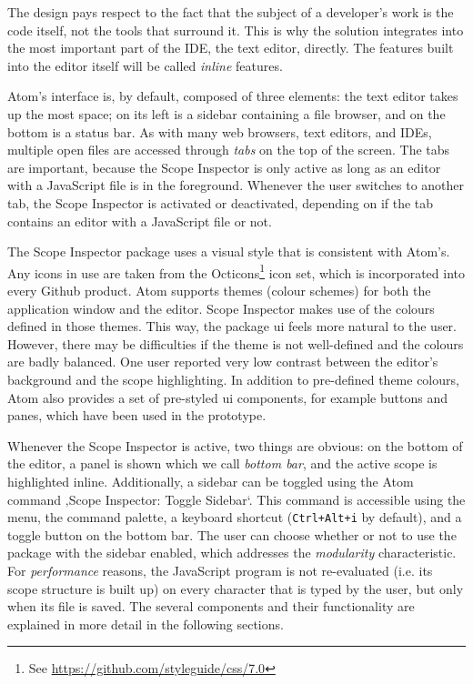 The design pays respect to the fact that the subject of a developer’s
work is the code itself, not the tools that surround it. This is why the
solution integrates into the most important part of the IDE, the text
editor, directly. The features built into the editor itself will be
called \emph{inline} features.

Atom’s interface is, by default, composed of three elements: the text
editor takes up the most space; on its left is a sidebar containing a
file browser, and on the bottom is a status bar. As with many web
browsers, text editors, and IDEs, multiple open files are accessed
through \emph{tabs} on the top of the screen. The tabs are important,
because the Scope Inspector is only active as long as an editor with a
JavaScript file is in the foreground. Whenever the user switches to
another tab, the Scope Inspector is activated or deactivated, depending
on if the tab contains an editor with a JavaScript file or not.

The Scope Inspector package uses a visual style that is consistent with
Atom’s. Any icons in use are taken from the
Octicons\footnote{See \url{https://github.com/styleguide/css/7.0}} icon
set, which is incorporated into every Github product. Atom supports
themes (colour schemes) for both the application window and the editor.
Scope Inspector makes use of the colours defined in those themes. This
way, the package \ac{ui} feels more natural to the user. However, there
may be difficulties if the theme is not well-defined and the colours are
badly balanced. One user reported very low contrast between the editor’s
background and the scope highlighting. In addition to pre-defined theme
colours, Atom also provides a set of pre-styled \ac{ui} components, for
example buttons and panes, which have been used in the prototype.

Whenever the Scope Inspector is active, two things are obvious: on the
bottom of the editor, a panel is shown which we call \emph{bottom bar},
and the active scope is highlighted inline. Additionally, a sidebar can
be toggled using the Atom command ‚Scope Inspector: Toggle Sidebar‘.
This command is accessible using the menu, the command palette, a
keyboard shortcut (\texttt{Ctrl+Alt+i} by default), and a toggle button
on the bottom bar. The user can choose whether or not to use the package
with the sidebar enabled, which addresses the \emph{modularity}
characteristic. For \emph{performance} reasons, the JavaScript program
is not re-evaluated (i.e. its scope structure is built up) on every
character that is typed by the user, but only when its file is saved.
The several components and their functionality are explained in more
detail in the following sections.

